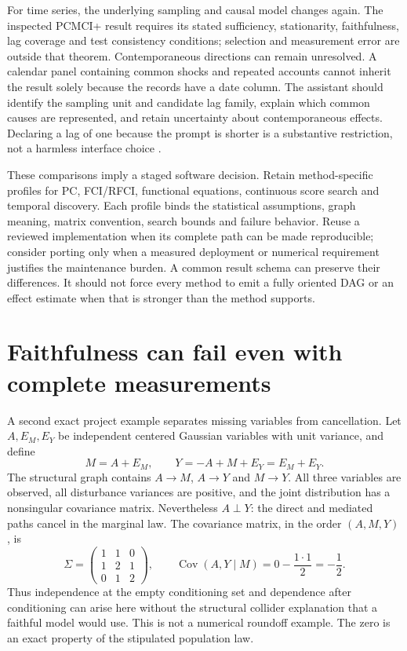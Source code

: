 For time series, the underlying sampling and causal model changes again.
The inspected PCMCI+ result requires its stated sufficiency, stationarity,
faithfulness, lag coverage and test consistency conditions; selection and
measurement error are outside that theorem. Contemporaneous directions can
remain unresolved. A calendar panel containing common shocks and repeated
accounts cannot inherit the result solely because the records have a date
column. The assistant should identify the sampling unit and candidate lag
family, explain which common causes are represented, and retain uncertainty
about contemporaneous effects. Declaring a lag of one because the prompt is
shorter is a substantive restriction, not a harmless interface choice
\citep{runge2020}.

These comparisons imply a staged software decision. Retain method-specific
profiles for PC, FCI/RFCI, functional equations, continuous score search and
temporal discovery. Each profile binds the statistical assumptions, graph
meaning, matrix convention, search bounds and failure behavior. Reuse a
reviewed implementation when its complete path can be made reproducible;
consider porting only when a measured deployment or numerical requirement
justifies the maintenance burden. A common result schema can preserve their
differences. It should not force every method to emit a fully oriented DAG or
an effect estimate when that is stronger than the method supports.

\section{Faithfulness can fail even with complete measurements}
\label{exec14:l4-faithfulness}

A second exact project example separates missing variables from cancellation.
Let $A,E_M,E_Y$ be independent centered Gaussian variables with unit variance,
and define
\[
 M=A+E_M,\qquad Y=-A+M+E_Y=E_M+E_Y.
\]
The structural graph contains $A\to M$, $A\to Y$ and $M\to Y$. All three
variables are observed, all disturbance variances are positive, and the
joint distribution has a nonsingular covariance matrix. Nevertheless
$A\perp Y$: the direct and mediated paths cancel in the marginal law.
The covariance matrix, in the order $(A,M,Y)$, is
\[
 \Sigma=\begin{pmatrix}1&1&0\\1&2&1\\0&1&2\end{pmatrix},
 \qquad
 \operatorname{Cov}(A,Y\mid M)=0-\frac{1\cdot1}{2}=-\frac12.
\]
Thus independence at the empty conditioning set and dependence after
conditioning can arise here without the structural collider explanation
that a faithful model would use. This is not a numerical roundoff example.
The zero is an exact property of the stipulated population law.


